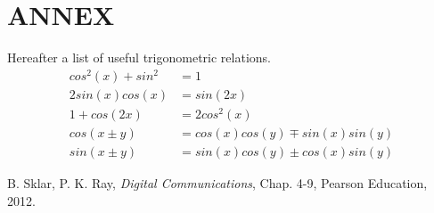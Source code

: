 \documentclass[twoside,twocolumn]{article}
\begin{document}

\section{ANNEX}
Hereafter a list of useful trigonometric relations.
\begin{align}
cos^{2}(x) + sin^{2} &= 1 \nonumber \\
2sin(x)cos(x) &= sin(2x) \nonumber \\
1 + cos(2x) &= 2cos^{2}(x) \nonumber \\
cos(x \pm y) &= cos(x)cos(y) \mp sin(x)sin(y) \nonumber \\
sin(x \pm y) &= sin(x)cos(y) \pm cos(x)sin(y) \nonumber
\end{align}


\begin{thebibliography}{99} %

 B. Sklar, P. K. Ray, \textit{Digital Communications}, Chap. 4-9, Pearson Education, 2012.
 
\end{thebibliography}






\end{document}
